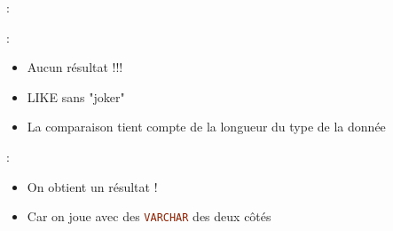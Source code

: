 \documentclass[10pt]{beamer}
\begin{document}
\begin{frame}{\secname : \subsecname}
    
\end{frame}

\begin{frame}{\secname : \subsecname}
    
    \begin{itemize}
        \item Aucun résultat !!!
        \item LIKE sans "joker"
        \item La comparaison tient compte de la longueur du type de la donnée
    \end{itemize}
\end{frame}

\begin{frame}{\secname : \subsecname}
    
    \begin{itemize}
        \item On obtient un résultat !
        \item Car on joue avec des \lstinline[language=sql]!VARCHAR! des deux côtés
    \end{itemize}
\end{frame}
\end{document}
